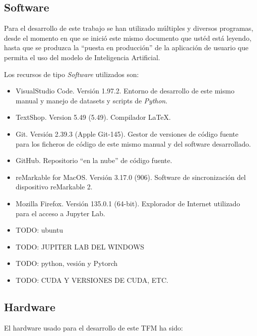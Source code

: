 %


\subsection{Software}

Para el desarrollo de este trabajo se han utilizado múltiples y diversos programas, desde el momento en que se inició este mismo documento que ustéd está leyendo, hasta que se produzca la ``puesta en producción'' de la aplicación de usuario que permita el uso del modelo de Inteligencia Artificial.

Los recursos de tipo \emph{Software} utilizados son:

\begin{itemize}
    \item VisualStudio Code. Versión 1.97.2. Entorno de desarrollo de este mismo manual y manejo de datasets y scripts de \emph{Python}.
    \item TextShop. Version 5.49 (5.49). Compilador \LaTeX.
    \item Git. Versión 2.39.3 (Apple Git-145). Gestor de versiones de código fuente para los ficheros de código de este mismo manual y del software desarrollado.
    \item GitHub. Repositorio ``en la nube'' de código fuente.
    \item reMarkable for MacOS. Versión 3.17.0 (906). Software de sincronización del dispositivo reMarkable 2.
    \item Mozilla Firefox. Versión 135.0.1 (64-bit). Explorador de Internet utilizado para el acceso a Jupyter Lab.
    \item TODO: ubuntu
    \item TODO: JUPITER LAB DEL WINDOWS
    \item TODO: python, vesión y Pytorch
    \item TODO: CUDA Y VERSIONES DE CUDA, ETC.
\end{itemize}

\subsection{Hardware}

El hardware usado para el desarrollo de este TFM ha sido:

